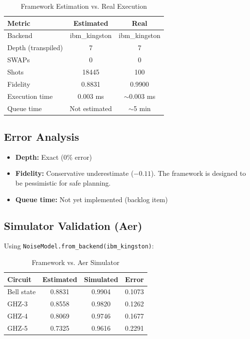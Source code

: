 \documentclass[11pt,a4paper]{article}
\begin{document}
\begin{table}[htbp]
\centering
\caption{Framework Estimation vs. Real Execution}
\begin{tabular}{@{}lcc@{}}
\toprule
\textbf{Metric} & \textbf{Estimated} & \textbf{Real} \\
\midrule
Backend & ibm\_kingston & ibm\_kingston \\
Depth (transpiled) & 7 & 7 \\
SWAPs & 0 & 0 \\
Shots & 18445 & 100 \\
Fidelity & 0.8831 & 0.9900 \\
Execution time & 0.003 ms & $\sim$0.003 ms \\
Queue time & Not estimated & $\sim$5 min \\
\bottomrule
\end{tabular}
\end{table}

\subsection{Error Analysis}

\begin{itemize}[leftmargin=2em]
    \item \textbf{Depth:} Exact (0\% error)
    \item \textbf{Fidelity:} Conservative underestimate ($-0.11$). The framework is designed to be pessimistic for safe planning.
    \item \textbf{Queue time:} Not yet implemented (backlog item)
\end{itemize}

\subsection{Simulator Validation (Aer)}

Using \texttt{NoiseModel.from\_backend(ibm\_kingston)}:

\begin{table}[htbp]
\centering
\caption{Framework vs. Aer Simulator}
\begin{tabular}{@{}lccc@{}}
\toprule
\textbf{Circuit} & \textbf{Estimated} & \textbf{Simulated} & \textbf{Error} \\
\midrule
Bell state & 0.8831 & 0.9904 & 0.1073 \\
GHZ-3 & 0.8558 & 0.9820 & 0.1262 \\
GHZ-4 & 0.8069 & 0.9746 & 0.1677 \\
GHZ-5 & 0.7325 & 0.9616 & 0.2291 \\
\bottomrule
\end{tabular}
\end{table}
\end{document}
